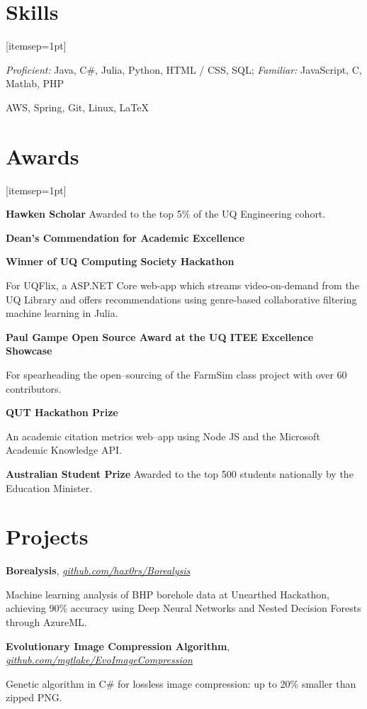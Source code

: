 \documentclass[a4paper]{article}
\renewenvironment{itemize}{
  \begin{list}{}{
    \setlength{\leftmargin}{1.5em}
  }
}{
  \end{list}
}
\newcommand{\dateitem}[1] {\item[\textbf{#1 :}]}
\newcommand{\resumesection}[1]{\section*{\accentcolour #1}}
\newcommand{\accentcolour}{\color{NavyBlue}}
\begin{document}
\resumesection{Skills}
\begin{itemize}[itemsep=1pt]  
	\dateitem{Languages} {
		\textit{Proficient:} Java, C\#, Julia, Python, HTML / CSS, SQL;
		\textit{Familiar:} JavaScript, C, Matlab, PHP
	}
	\dateitem{Technologies} {
		AWS, Spring, Git, Linux, \LaTeX
	}
\end{itemize}

\resumesection{Awards}
\begin{itemize}[itemsep=1pt]
	\dateitem{2017 -- 2019} {\textbf{Hawken Scholar} Awarded to the top 5\% of the UQ Engineering cohort.
	}
	\dateitem{2016 -- 2018} \textbf{Dean's Commendation for Academic Excellence}
	\dateitem{2016} {\textbf{Winner of UQ Computing Society Hackathon}
		
		For UQFlix, a ASP.NET Core web-app which streams video-on-demand from the UQ Library and offers recommendations using genre-based collaborative filtering machine learning in Julia.
	}
	\dateitem{2015} {\textbf{Paul Gampe Open Source Award at the UQ ITEE Excellence Showcase}
		
		For spearheading the open--sourcing of the FarmSim class project with over 60 contributors.
	}

	\dateitem{2015} {\textbf{QUT Hackathon Prize}
		
		An academic citation metrics web--app using Node JS and the Microsoft Academic Knowledge API.
	}
	\dateitem{2013} {\textbf{Australian Student Prize} Awarded to the top 500 students nationally by the Education Minister.
	}
\end{itemize}

\resumesection{Projects}
\begin{itemize}	
	\item[] {\textbf{Borealysis}, \textit{\href{https://github.com/hax0rs/Borealysis}{github.com/hax0rs/Borealysis}}
		
		Machine learning analysis of BHP borehole data at Unearthed Hackathon, achieving 90\% accuracy using Deep Neural Networks and Nested Decision Forests through AzureML.
	}
	
	\item[] {\textbf{Evolutionary Image Compression Algorithm}, \textit{\href{https://github.com/mgtlake/EvoImageCompression}{github.com/mgtlake/EvoImageCompression}}
		
		Genetic algorithm in C\# for lossless image compression: up to 20\% smaller than zipped PNG.
	}
\end{itemize}

\bigskip
\end{document}

